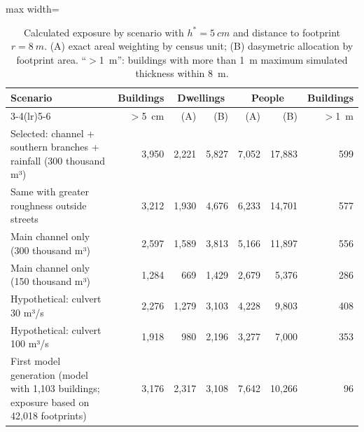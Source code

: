 \begin{table}[htbp]\centering\small
\caption{Calculated exposure by scenario with $h^*=\SI{5}{cm}$ and distance to footprint $r=\SI{8}{m}$. (A) exact areal weighting by census unit; (B) dasymetric allocation by footprint area. ``$>$\SI{1}{m}'': buildings with more than \SI{1}{m} maximum simulated thickness within \SI{8}{m}.}\label{tab:exposicion}
\begin{adjustbox}{max width=\textwidth}\begin{tabular}{p{}rrrrrr}\toprule
Scenario & Buildings & \multicolumn{2}{c}{Dwellings} & \multicolumn{2}{c}{People} & Buildings\\\cmidrule(lr){3-4}\cmidrule(lr){5-6}
 & $>$\SI{5}{cm} & (A) & (B) & (A) & (B) & $>$\SI{1}{m}\\\midrule
Selected: channel + southern branches + rainfall (300 thousand m³) & 3,950 & 2,221 & 5,827 & 7,052 & 17,883 & 599\\
Same with greater roughness outside streets & 3,212 & 1,930 & 4,676 & 6,233 & 14,701 & 577\\
Main channel only (300 thousand m³) & 2,597 & 1,589 & 3,813 & 5,166 & 11,897 & 556\\
Main channel only (150 thousand m³) & 1,284 & 669 & 1,429 & 2,679 & 5,376 & 286\\
Hypothetical: culvert 30 m³/s & 2,276 & 1,279 & 3,103 & 4,228 & 9,803 & 408\\
Hypothetical: culvert 100 m³/s & 1,918 & 980 & 2,196 & 3,277 & 7,000 & 353\\
First model generation (model with 1,103 buildings; exposure based on 42,018 footprints) & 3,176 & 2,317 & 3,108 & 7,642 & 10,266 & 96\\
\bottomrule\end{tabular}\end{adjustbox}\end{table}
